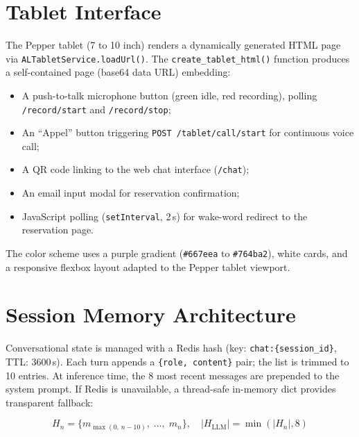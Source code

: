\documentclass[a4paper]{article}
\begin{document}
\section{Tablet Interface}

The Pepper tablet (7 to 10 inch) renders a dynamically generated HTML page via \texttt{ALTabletService.loadUrl()}. The \texttt{create\_tablet\_html()} function produces a self-contained page (base64 data URL) embedding:

\begin{itemize}
  \item A push-to-talk microphone button (green idle, red recording), polling \texttt{/record/start} and \texttt{/record/stop};
  \item An ``Appel'' button triggering \texttt{POST /tablet/call/start} for continuous voice call;
  \item A QR code linking to the web chat interface (\texttt{/chat});
  \item An email input modal for reservation confirmation;
  \item JavaScript polling (\texttt{setInterval}, 2\,s) for wake-word redirect to the reservation page.
\end{itemize}

The color scheme uses a purple gradient (\texttt{\#667eea} to \texttt{\#764ba2}), white cards, and a responsive flexbox layout adapted to the Pepper tablet viewport.

\section{Session Memory Architecture}

Conversational state is managed with a Redis hash (key: \texttt{chat:\{session\_id\}}, TTL: 3600\,s). Each turn appends a \texttt{\{role, content\}} pair; the list is trimmed to 10 entries. At inference time, the 8 most recent messages are prepended to the system prompt. If Redis is unavailable, a thread-safe in-memory dict provides transparent fallback:

\begin{equation}
  H_n = \{m_{\max(0,\,n-10)},\; \ldots,\; m_n\}, \quad |H_{\text{LLM}}| = \min(|H_n|, 8)
  \label{eq:history}
\end{equation}
\end{document}
